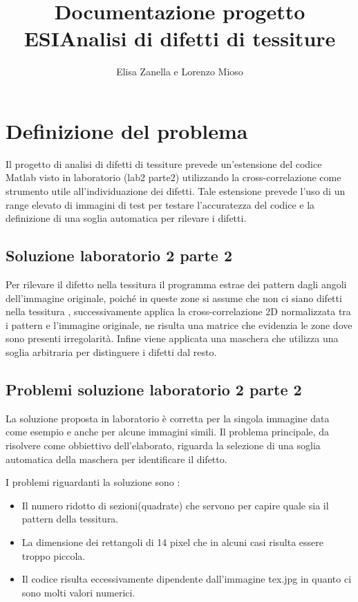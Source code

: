 \documentclass{article}
\author{Elisa Zanella e Lorenzo Mioso}
\title{Documentazione progetto ESI\newline Analisi di difetti di tessiture}
\begin{document}
\maketitle

\newpage

\tableofcontents

\newpage

\newpage

\section{Definizione del problema}
Il progetto di analisi di difetti di tessiture prevede un'estensione del codice Matlab visto in laboratorio (lab2 parte2) utilizzando la cross-correlazione come strumento utile all'individuazione dei difetti. Tale estensione prevede l'uso di un range elevato di immagini di test per testare l'accuratezza del codice e la definizione di una soglia automatica per rilevare i difetti.

\subsection{Soluzione laboratorio 2 parte 2}
Per rilevare il difetto nella tessitura il programma estrae dei pattern dagli angoli
dell'immagine originale, poiché in queste zone si assume che non ci siano difetti nella tessitura
, successivamente applica la cross-correlazione 2D normalizzata tra i pattern e l'immagine originale, ne risulta una matrice che evidenzia le zone dove sono presenti irregolarità.
Infine viene applicata una maschera che utilizza una soglia arbitraria per distinguere i difetti dal resto.

\subsection{Problemi soluzione laboratorio 2 parte 2}
La soluzione proposta in laboratorio è corretta per la singola immagine data come esempio e anche per alcune immagini simili.
Il problema principale, da risolvere come obbiettivo dell'elaborato, riguarda la selezione di una soglia automatica della maschera per identificare il difetto.


I problemi riguardanti la soluzione sono :
\begin{itemize}
    \item Il numero ridotto di sezioni(quadrate) che servono per capire quale sia il pattern della tessitura.
    
    \item La dimensione dei rettangoli di 14 pixel che in alcuni casi risulta essere troppo piccola.
    
    \item Il codice risulta eccessivamente dipendente dall'immagine tex.jpg in quanto ci sono molti valori numerici.
    
\end{itemize}
 
\end{document}
